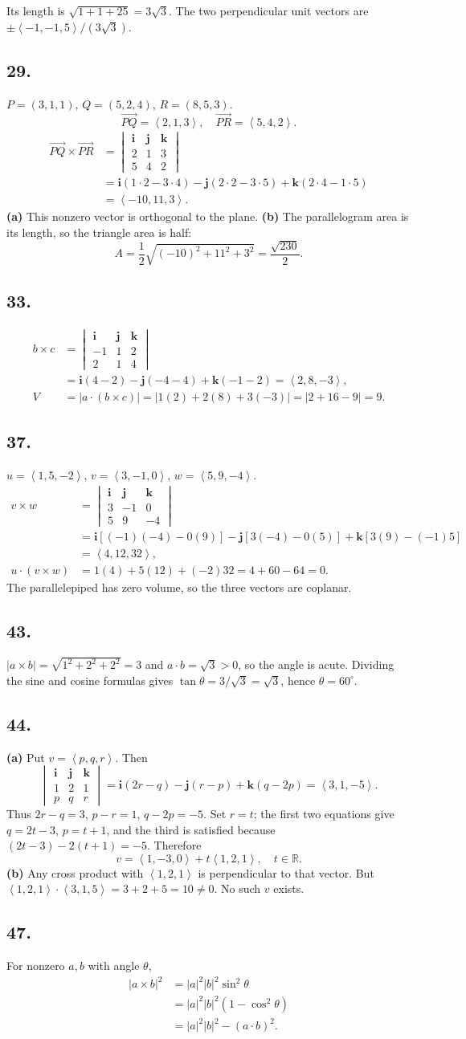 \documentclass[11pt]{article}
\newcommand{\ex}[1]{\subsection*{#1.}}
\newcommand{\ans}[1]{\boxed{#1}}
\newcommand{\vv}[1]{\left\langle #1\right\rangle}
\newcommand{\ii}{\mathbf i}\newcommand{\jj}{\mathbf j}\newcommand{\kk}{\mathbf k}
\newcommand{\cp}[6]{\begin{vmatrix}\ii&\jj&\kk\\#1&#2&#3\\#4&#5&#6\end{vmatrix}}
\begin{document}
Its length is $\sqrt{1+1+25}=3\sqrt3$. The two perpendicular unit vectors are $\ans{\pm\vv{-1,-1,5}/(3\sqrt3)}$.
\ex{29}
$P=(3,1,1)$, $Q=(5,2,4)$, $R=(8,5,3)$.
\[\overrightarrow{PQ}=\vv{2,1,3},\quad\overrightarrow{PR}=\vv{5,4,2}.\]
\begin{align*}\overrightarrow{PQ}\times\overrightarrow{PR}&=\cp{2}{1}{3}{5}{4}{2}\\&=\ii(1\cdot2-3\cdot4)-\jj(2\cdot2-3\cdot5)+\kk(2\cdot4-1\cdot5)\\&=\ans{\vv{-10,11,3}}.
\end{align*}
\textbf{(a)} This nonzero vector is orthogonal to the plane. \textbf{(b)} The parallelogram area is its length, so the triangle area is half:
\[\ans{A=\frac12\sqrt{(-10)^2+11^2+3^2}=\frac{\sqrt{230}}2}.\]
\ex{33}
\begin{align*}b\times c&=\cp{-1}{1}{2}{2}{1}{4}\\&=\ii(4-2)-\jj(-4-4)+\kk(-1-2)=\vv{2,8,-3},\\V&=|a\cdot(b\times c)|=|1(2)+2(8)+3(-3)|=|2+16-9|=\ans9.
\end{align*}
\ex{37}
$u=\vv{1,5,-2}$, $v=\vv{3,-1,0}$, $w=\vv{5,9,-4}$.
\begin{align*}v\times w&=\cp{3}{-1}{0}{5}{9}{-4}\\&=\ii[(-1)(-4)-0(9)]-\jj[3(-4)-0(5)]+\kk[3(9)-(-1)5]\\&=\vv{4,12,32},\\u\cdot(v\times w)&=1(4)+5(12)+(-2)32=4+60-64=\ans0.
\end{align*}
The parallelepiped has zero volume, so the three vectors are coplanar.
\ex{43}
$|a\times b|=\sqrt{1^2+2^2+2^2}=3$ and $a\cdot b=\sqrt3>0$, so the angle is acute. Dividing the sine and cosine formulas gives $\tan\theta=3/\sqrt3=\sqrt3$, hence $\ans{\theta=60^\circ}$.
\ex{44}
\textbf{(a)} Put $v=\vv{p,q,r}$. Then
\[\cp{1}{2}{1}{p}{q}{r}=\ii(2r-q)-\jj(r-p)+\kk(q-2p)=\vv{3,1,-5}.\]
Thus $2r-q=3$, $p-r=1$, $q-2p=-5$. Set $r=t$; the first two equations give $q=2t-3$, $p=t+1$, and the third is satisfied because $(2t-3)-2(t+1)=-5$. Therefore
\[\ans{v=\vv{1,-3,0}+t\vv{1,2,1},\quad t\in\mathbb R}.\]
\textbf{(b)} Any cross product with $\vv{1,2,1}$ is perpendicular to that vector. But $\vv{1,2,1}\cdot\vv{3,1,5}=3+2+5=10\ne0$. No such $v$ exists.
\ex{47}
For nonzero $a,b$ with angle $\theta$,
\begin{align*}|a\times b|^2&=|a|^2|b|^2\sin^2\theta\\&=|a|^2|b|^2(1-\cos^2\theta)\\&=\ans{|a|^2|b|^2-(a\cdot b)^2}.
\end{align*}
\end{document}

